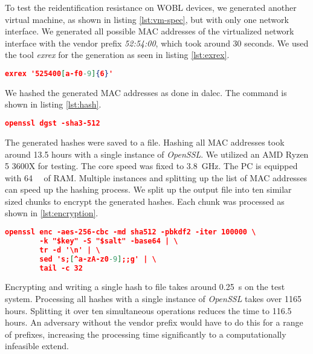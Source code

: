     To test the reidentification resistance on WOBL devices, we generated another virtual machine, as shown in listing \ref{lst:vm-spec}, but with only one network interface. 
    We generated all possible MAC addresses of the virtualized network interface with the vendor prefix \textit{52:54:00}, which took around 30 seconds. We used the tool \textit{exrex} \cite{tauber_asciimooexrex_2021} for the generation as seen in listing \ref{lst:exrex}. 
    
    \begin{lstlisting}[language=json, caption=MAC generation with exrex, label=lst:exrex]
    exrex '525400[a-f0-9]{6}'
    \end{lstlisting}    
    
    We hashed the generated MAC addresses as done in dalec. The command is shown in listing \ref{lst:hash}.
    
    \begin{lstlisting}[language=json, caption=MAC hashing with OpenSSL, label=lst:hash]
openssl dgst -sha3-512
    \end{lstlisting}
    
    The generated hashes were saved to a file. Hashing all MAC addresses took around 13.5 hours with a single instance of \textit{OpenSSL}.
    We utilized an AMD Ryzen 5 3600X for testing. The core speed was fixed to \SIlist{3.8}{\giga\hertz}. The PC is equipped with \SIlist{64}{\giga\byte} of RAM.
    Multiple instances and splitting up the list of MAC addresses can speed up the hashing process.
    We split up the output file into ten similar sized chunks to encrypt the generated hashes. Each chunk was processed as shown in \ref{lst:encryption}.
    
    \begin{lstlisting}[language=json, caption=ID encryption and truncation, label=lst:encryption]
    openssl enc -aes-256-cbc -md sha512 -pbkdf2 -iter 100000 \                          
        -k "$key" -S "$salt" -base64 | \                                      
        tr -d '\n' | \                                                        
        sed 's;[^a-zA-z0-9];;g' | \
        tail -c 32
    \end{lstlisting}
    
\newpage
    
    Encrypting and writing a single hash to file takes around \SIlist{0.25}{\second} on the test system. Processing all hashes with a single instance of \textit{OpenSSL} takes over 1165 hours. Splitting it over ten simultaneous operations reduces the time to 116.5 hours.
    An adversary without the vendor prefix would have to do this for a range of prefixes, increasing the processing time significantly to a computationally infeasible extend.\\
    
